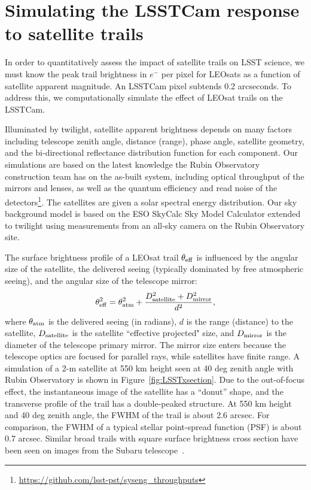 \documentclass[twocolumn,trackchanges]{aastex63}
\begin{document}
\section{Simulating the LSSTCam response to satellite trails}
\label{sec:sim-cam-response}

In order to quantitatively assess the impact of satellite trails on LSST science, we must know the peak trail brightness in  $e^-$ per pixel for LEOsats as a function of satellite apparent magnitude. An LSSTCam pixel subtends 0.2 arcseconds. To address this, we computationally simulate the effect of LEOsat trails on the LSSTCam.

Illuminated by twilight, satellite apparent brightness depends on many factors including telescope zenith angle, distance (range), phase angle, satellite geometry, and the bi-directional reflectance distribution function
for each component.
Our simulations are based on the latest knowledge the Rubin Observatory construction team has on the as-built system, including optical throughput of the mirrors and lenses, as well as the quantum efficiency and read noise of the detectors\footnote{\url{https://github.com/lsst-pst/syseng_throughputs}}.
The satellites are given a solar spectral energy distribution.
Our sky background model \citep{2016SPIE.9910E..1AY} is based on the ESO SkyCalc Sky Model Calculator extended to twilight using measurements from an all-sky camera on the Rubin Observatory site.

The surface brightness profile of a LEOsat trail $\theta_{\rm eff}$ is influenced by the angular size of the satellite, the delivered seeing (typically dominated by free atmospheric seeing), and the angular size of the telescope mirror:
\begin{equation}\label{eq:satsize}
\theta^2_{\rm eff} = \theta^2_{\rm atm} + \frac{D^2_{\rm satellite} + D^2_{\rm mirror}}{d^2},
\end{equation}
where $\theta_{\rm atm}$ is the delivered seeing (in radians), $d$ is the range (distance) to the satellite, $D_{\rm satellite}$ is the satellite ``effective projected" size, and $D_{\rm mirror}$ is the diameter of the telescope primary mirror. The mirror size enters because the telescope optics are focused for parallel rays, while satellites have finite range. A simulation of a 2-m satellite at 550 km height seen at 40 deg zenith angle with Rubin Observatory is shown in Figure~\ref{fig:LSSTxsection}.
Due to the out-of-focus effect, the instantaneous image of the satellite has a ``donut'' shape, and the transverse profile of the trail has a double-peaked structure. At 550 km height and 40 deg zenith angle, the FWHM of the trail is about 2.6 arcsec. For comparison, the FWHM of a typical stellar point-spread function (PSF) is about 0.7 arcsec.  Similar broad trails with square surface brightness cross section have been seen on images from the Subaru telescope~\citep{2007PASJ...59..841I}.
\end{document}
